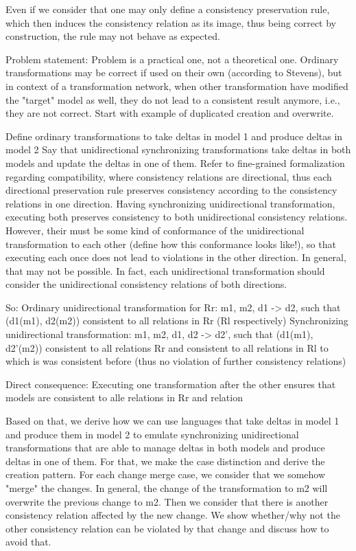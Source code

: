 Even if we consider that one may only define a consistency preservation rule, which then induces the consistency relation as its image, thus being correct by construction, the rule may not behave as expected.


Problem statement: Problem is a practical one, not a theoretical one.
Ordinary transformations may be correct if used on their own (according to Stevens), but in context of a transformation network, when other transformation have modified the "target" model as well, they do not lead to a consistent result anymore, i.e., they are not correct.
Start with example of duplicated creation and overwrite.

Define ordinary transformations to take deltas in model 1 and produce deltas in model 2
Say that unidirectional synchronizing transformations take deltas in both models and update the deltas in one of them.
Refer to fine-grained formalization regarding compatibility, where consistency relations are directional, thus each directional preservation rule preserves consistency according to the consistency relations in one direction.
Having synchronizing unidirectional transformation, executing both preserves consistency to both unidirectional consistency relations. However, their must be some kind of conformance of the unidirectional transformation to each other (define how this conformance looks like!), so that executing each once does not lead to violations in the other direction. In general, that may not be possible. In fact, each unidirectional transformation should consider the unidirectional consistency relations of both directions.

So:
Ordinary unidirectional transformation for Rr: m1, m2, d1 -> d2, such that (d1(m1), d2(m2)) consistent to all relations in Rr (Rl respectively)
Synchronizing unidirectional transformation: m1, m2, d1, d2 -> d2', such that (d1(m1), d2'(m2)) consistent to all relations Rr and consistent to all relations in Rl to which is was consistent before (thus no violation of further consistency relations)

Direct consequence: Executing one transformation after the other ensures that models are consistent to alle relations in Rr and relation

Based on that, we derive how we can use languages that take deltas in model 1 and produce them in model 2 to emulate synchronizing unidirectional transformations that are able to manage deltas in both models and produce deltas in one of them.
For that, we make the case distinction and derive the creation pattern.
For each change merge case, we consider that we somehow "merge" the changes. In general, the change of the transformation to m2 will overwrite the previous change to m2. Then we consider that there is another consistency relation affected by the new change. We show whether/why not the other consistency relation can be violated by that change and discuss how to avoid that.


